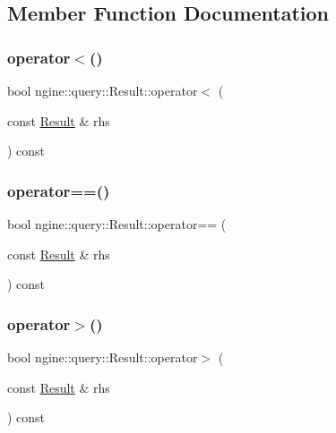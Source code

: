 \subsection{Member Function Documentation}
\mbox{\label{structngine_1_1query_1_1Result_a6df5141cfffe710ff3e5b43358d94ddf}} 
\subsubsection{\texorpdfstring{operator$<$()}{operator<()}}
{\footnotesize\ttfamily bool ngine\+::query\+::\+Result\+::operator$<$ (\begin{DoxyParamCaption}\item[{const \hyperlink{structngine_1_1query_1_1Result}{Result} \&}]{rhs }\end{DoxyParamCaption}) const\hspace{0.3cm}{\ttfamily [inline]}}

\mbox{\label{structngine_1_1query_1_1Result_a34eb1df1154ab0ab492ee95e77edf234}} 
\subsubsection{\texorpdfstring{operator==()}{operator==()}}
{\footnotesize\ttfamily bool ngine\+::query\+::\+Result\+::operator== (\begin{DoxyParamCaption}\item[{const \hyperlink{structngine_1_1query_1_1Result}{Result} \&}]{rhs }\end{DoxyParamCaption}) const\hspace{0.3cm}{\ttfamily [inline]}}

\mbox{\label{structngine_1_1query_1_1Result_a52c1869064bfd7f51476c4d8560f05f2}} 
\subsubsection{\texorpdfstring{operator$>$()}{operator>()}}
{\footnotesize\ttfamily bool ngine\+::query\+::\+Result\+::operator$>$ (\begin{DoxyParamCaption}\item[{const \hyperlink{structngine_1_1query_1_1Result}{Result} \&}]{rhs }\end{DoxyParamCaption}) const\hspace{0.3cm}{\ttfamily [inline]}}

